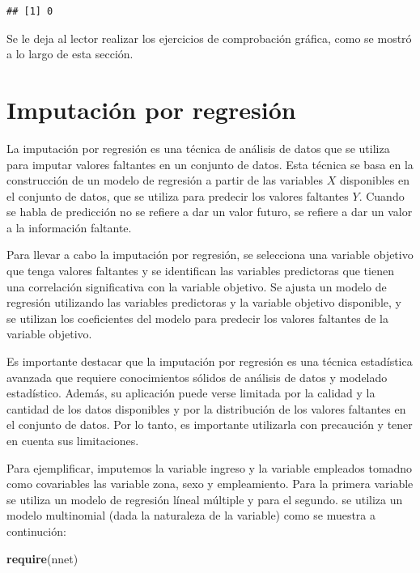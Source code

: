 \documentclass[
  12pt,
]{book}
\newenvironment{Shaded}{\begin{snugshade}}{\end{snugshade}}
\newcommand{\FunctionTok}[1]{\textcolor[rgb]{0.13,0.29,0.53}{\textbf{#1}}}
\newcommand{\NormalTok}[1]{#1}
\begin{document}
\begin{verbatim}
## [1] 0
\end{verbatim}

Se le deja al lector realizar los ejercicios de comprobación gráfica, como se mostró a lo largo de esta sección.

\section{Imputación por regresión}\label{imputaciuxf3n-por-regresiuxf3n}

La imputación por regresión es una técnica de análisis de datos que se utiliza para imputar valores faltantes en un conjunto de datos. Esta técnica se basa en la construcción de un modelo de regresión a partir de las variables \(X\) disponibles en el conjunto de datos, que se utiliza para predecir los valores faltantes \(Y\). Cuando se habla de predicción no se refiere a dar un valor futuro, se refiere a dar un valor a la información faltante.

Para llevar a cabo la imputación por regresión, se selecciona una variable objetivo que tenga valores faltantes y se identifican las variables predictoras que tienen una correlación significativa con la variable objetivo. Se ajusta un modelo de regresión utilizando las variables predictoras y la variable objetivo disponible, y se utilizan los coeficientes del modelo para predecir los valores faltantes de la variable objetivo.

Es importante destacar que la imputación por regresión es una técnica estadística avanzada que requiere conocimientos sólidos de análisis de datos y modelado estadístico. Además, su aplicación puede verse limitada por la calidad y la cantidad de los datos disponibles y por la distribución de los valores faltantes en el conjunto de datos. Por lo tanto, es importante utilizarla con precaución y tener en cuenta sus limitaciones.

Para ejemplificar, imputemos la variable ingreso y la variable empleados tomadno como covariables las variable zona, sexo y empleamiento. Para la primera variable se utiliza un modelo de regresión líneal múltiple y para el segundo. se utiliza un modelo multinomial (dada la naturaleza de la variable) como se muestra a continución:

\begin{Shaded}
\begin{Highlighting}[]
\FunctionTok{require}\NormalTok{(nnet)}
\end{Highlighting}
\end{Shaded}
\end{document}
